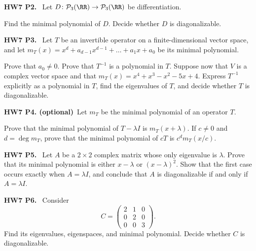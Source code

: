 \documentclass[10pt]{scrartcl}
\begin{document}
\begin{prob}
\textbf{HW7 P2. }\ Let $D\colon\PP_3(\RR)\to\PP_3(\RR)$ be differentiation.
\begin{enumerate}[(a)]
  \ii Find the minimal polynomial of $D$.
  \ii Decide whether $D$ is diagonalizable.
\end{enumerate}
\end{prob}

\begin{prob}
\textbf{HW7 P3. }\ Let $T$ be an invertible operator on a finite-dimensional vector space, and let $m_T(x)=x^d+a_{d-1}x^{d-1}+\dots+a_1x+a_0$ be its minimal polynomial.

\begin{enumerate}[(a)]
  \ii Prove that $a_0\ne0$.
  \ii Prove that $T^{-1}$ is a polynomial in $T$.
  \ii Suppose now that $V$ is a complex vector space and that $m_T(x)=x^4+x^3-x^2-5x+4$. Express $T^{-1}$ explicitly as a polynomial in $T$, find the eigenvalues of $T$, and decide whether $T$ is diagonalizable.
\end{enumerate}
\end{prob}

\begin{prob}
\textbf{HW7 P4. (optional)}\ Let $m_T$ be the minimal polynomial of an operator $T$.

\begin{enumerate}[(a)]
  \ii Prove that the minimal polynomial of $T-\lambda I$ is $m_T(x+\lambda)$.
  \ii If $c\ne0$ and $d=\deg m_T$, prove that the minimal polynomial of $cT$ is $c^dm_T(x/c)$.
\end{enumerate}
\end{prob}

\begin{prob}
\textbf{HW7 P5. }\ Let $A$ be a $2\times2$ complex matrix whose only eigenvalue is $\lambda$. Prove that its minimal polynomial is either $x-\lambda$ or $(x-\lambda)^2$. Show that the first case occurs exactly when $A=\lambda I$, and conclude that $A$ is diagonalizable if and only if $A=\lambda I$.

\end{prob}

\begin{prob}
\textbf{HW7 P6. }\ Consider
\[
  C=\begin{pmatrix}2&1&0\\0&2&0\\0&0&3\end{pmatrix}.
\]
Find its eigenvalues, eigenspaces, and minimal polynomial. Decide whether $C$ is diagonalizable.

\end{prob}
\end{document}
